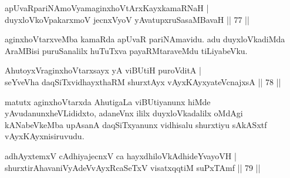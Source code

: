 
\begin{shl}
apUvaRpariNAmoV\s yamaginxhoVtArxKayxkamaRNaH | \\
duyxloVkoVpakarxmoV jecnxVyoV yAvatupxruSasaMBavaH \hfill|| 77 || 
\end{shl}

\begin{artha}
aginxhoVtarxveMba kamaRda apUvaR pariNAmavidu. adu duyxloVkadiMda 
AraMBisi puruSanalilx huTuTxva payaRMtaraveMdu tiLiyabeVku.
\end{artha}


\begin{shl}
AhutoyxVraginxhoVtarxsayx yA viBUtiH puroVditA | \\
seYveVha daqSiTxvidhayxthaRM shurxtAyx vAyxKAyxyateV\s cnajxsA \hfill|| 78 || 
\end{shl}

\begin{artha}
matutx aginxhoVtarxda AhutigaLa viBUtiyanunx hiMde yAvudanunx\break heVLididxto, adaneVnx ililx duyxloVkadalilx oMdAgi kANabeVkeMba upAsanA daqSiTxyanunx vidhisalu shurxtiyu sAkASxtf vAyxKAyxnisiruvudu.
\end{artha}

\begin{shl}
adhAyxtemxV cAdhiyajecnxV ca hayxdhiloVkAdhideYvayoVH | \\
shurxtirAhavaniVyAdeVvAyxRcaSeTxV visatxqqtiM suPxTAmf \hfill|| 79 || 
\end{shl}

